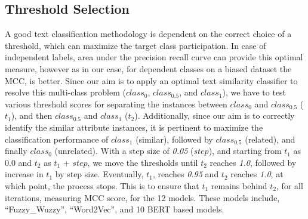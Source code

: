 \documentclass{ieeeaccess}
\begin{document}
\subsection{Threshold Selection}
A good text classification methodology is dependent on the correct choice of a threshold, which can maximize the target class participation. In case of independent labels, area under the precision recall curve can provide this optimal measure, however as in our case, for dependent classes on a biased dataset the MCC, is better\cite{chicco2020advantages}.
Since our aim is to apply an optimal text similarity classifier to resolve this multi-class problem ($class_0$, $class_{0.5}$, and $class_1$), we have to test various threshold scores for separating the instances between $class_0$ and $class_{0.5}$ ($t_1$), and then $class_{0.5}$ and $class_1$ ($t_2$). Additionally, since our aim is to correctly identify the similar attribute instances, it is pertinent to maximize the classification performance of $class_1$ (similar), followed by $class_{0.5}$ (related), and finally $class_0$ (unrelated).
With a step size of \textit{0.05} ($step$), and starting from $t_1$ as 0.0 and $t_2$ as $t_1$ + $step$, we move the thresholds until $t_2$ reaches \textit{1.0}, followed by increase in $t_1$ by step size. Eventually, $t_1$, reaches \textit{0.95} and $t_2$ reaches \textit{1.0}, at which point, the process stops. This is to ensure that $t_1$ remains behind $t_2$, for all iterations, measuring MCC score, for the 12 models. These models include, ``Fuzzy\_Wuzzy'', ``Word2Vec'', and 10 BERT based models.
\end{document}
